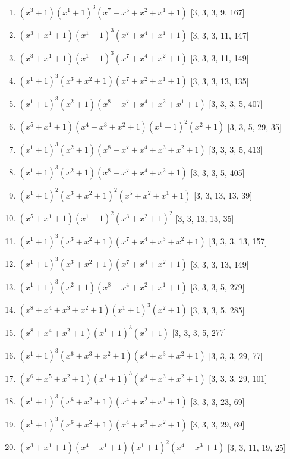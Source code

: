 \documentclass[10pt,twocolumn]{article}
\begin{document}
\begin{enumerate}
\item $(x^{3} + 1)(x^{1} + 1)^{3}(x^{7} + x^{5} + x^{2} + x^{1} + 1)$  [3, 3, 3, 9, 167]
\item $(x^{3} + x^{1} + 1)(x^{1} + 1)^{3}(x^{7} + x^{4} + x^{1} + 1)$  [3, 3, 3, 11, 147]
\item $(x^{3} + x^{1} + 1)(x^{1} + 1)^{3}(x^{7} + x^{4} + x^{2} + 1)$  [3, 3, 3, 11, 149]
\item $(x^{1} + 1)^{3}(x^{3} + x^{2} + 1)(x^{7} + x^{2} + x^{1} + 1)$  [3, 3, 3, 13, 135]
\item $(x^{1} + 1)^{3}(x^{2} + 1)(x^{8} + x^{7} + x^{4} + x^{2} + x^{1} + 1)$  [3, 3, 3, 5, 407]
\item $(x^{5} + x^{1} + 1)(x^{4} + x^{3} + x^{2} + 1)(x^{1} + 1)^{2}(x^{2} + 1)$  [3, 3, 5, 29, 35]
\item $(x^{1} + 1)^{3}(x^{2} + 1)(x^{8} + x^{7} + x^{4} + x^{3} + x^{2} + 1)$  [3, 3, 3, 5, 413]
\item $(x^{1} + 1)^{3}(x^{2} + 1)(x^{8} + x^{7} + x^{4} + x^{2} + 1)$  [3, 3, 3, 5, 405]
\item $(x^{1} + 1)^{2}(x^{3} + x^{2} + 1)^{2}(x^{5} + x^{2} + x^{1} + 1)$  [3, 3, 13, 13, 39]
\item $(x^{5} + x^{1} + 1)(x^{1} + 1)^{2}(x^{3} + x^{2} + 1)^{2}$  [3, 3, 13, 13, 35]
\item $(x^{1} + 1)^{3}(x^{3} + x^{2} + 1)(x^{7} + x^{4} + x^{3} + x^{2} + 1)$  [3, 3, 3, 13, 157]
\item $(x^{1} + 1)^{3}(x^{3} + x^{2} + 1)(x^{7} + x^{4} + x^{2} + 1)$  [3, 3, 3, 13, 149]
\item $(x^{1} + 1)^{3}(x^{2} + 1)(x^{8} + x^{4} + x^{2} + x^{1} + 1)$  [3, 3, 3, 5, 279]
\item $(x^{8} + x^{4} + x^{3} + x^{2} + 1)(x^{1} + 1)^{3}(x^{2} + 1)$  [3, 3, 3, 5, 285]
\item $(x^{8} + x^{4} + x^{2} + 1)(x^{1} + 1)^{3}(x^{2} + 1)$  [3, 3, 3, 5, 277]
\item $(x^{1} + 1)^{3}(x^{6} + x^{3} + x^{2} + 1)(x^{4} + x^{3} + x^{2} + 1)$  [3, 3, 3, 29, 77]
\item $(x^{6} + x^{5} + x^{2} + 1)(x^{1} + 1)^{3}(x^{4} + x^{3} + x^{2} + 1)$  [3, 3, 3, 29, 101]
\item $(x^{1} + 1)^{3}(x^{6} + x^{2} + 1)(x^{4} + x^{2} + x^{1} + 1)$  [3, 3, 3, 23, 69]
\item $(x^{1} + 1)^{3}(x^{6} + x^{2} + 1)(x^{4} + x^{3} + x^{2} + 1)$  [3, 3, 3, 29, 69]
\item $(x^{3} + x^{1} + 1)(x^{4} + x^{1} + 1)(x^{1} + 1)^{2}(x^{4} + x^{3} + 1)$  [3, 3, 11, 19, 25]

\end{enumerate}
\end{document}
